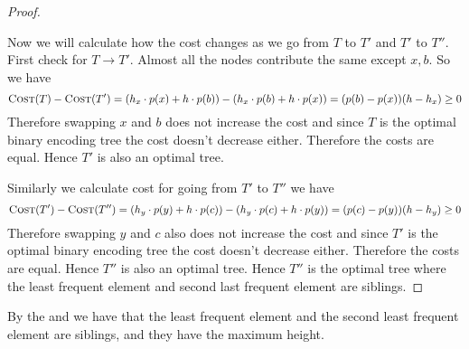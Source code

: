 \begin{proof}
\begin{center}
\label{fig:least-frequent-elm-siblings}
\end{center}

Now we will calculate how the cost changes as we go from $T$ to $T'$ and $T'$ to $T''$. First check for $T\to T'$. Almost all the nodes contribute the same except $x,b$. So we have $$\textsc{Cost}(T)-\textsc{Cost}(T')=(h_x\cdot p(x)+h\cdot p(b))-(h_x\cdot p(b)+h\cdot p(x))=(p(b)-p(x))(h-h_x)\geq 0$$Therefore swapping $x$ and $b$ does not increase the cost and since $T$ is the optimal binary encoding tree the cost doesn't decrease either. Therefore the costs are equal. Hence $T'$ is also an optimal tree. 

Similarly we calculate cost for going from $T'$ to $T''$ we have $$\textsc{Cost}(T')-\textsc{Cost}(T'')=(h_y\cdot p(y)+h\cdot p(c))-(h_y\cdot p(c)+h\cdot p(y))=(p(c)-p(y))(h-h_y)\geq 0$$Therefore swapping $y$ and $c$ also does not increase the cost and since $T'$ is the optimal binary encoding tree the cost doesn't decrease either. Therefore the costs are equal. Hence $T''$ is also an optimal tree. Hence $T''$ is the optimal tree where the least frequent element and second last frequent element are siblings.
\end{proof}




By the  and  we have that the least frequent element and the second least frequent element are siblings, and they have the maximum height.

